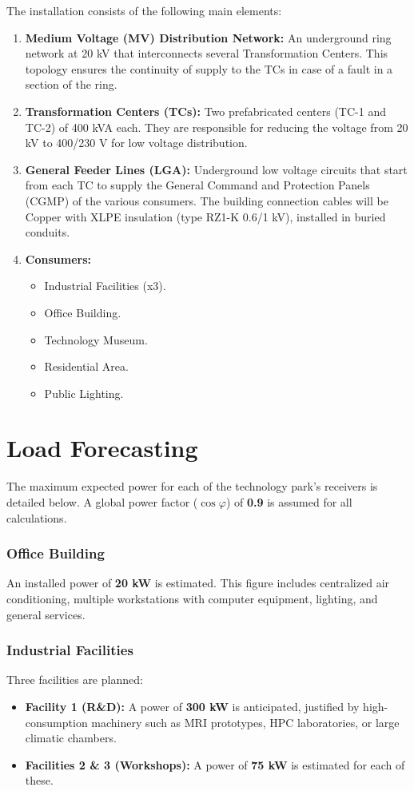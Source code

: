 \documentclass[12pt, a4paper]{report}
\begin{document}
The installation consists of the following main elements:
\begin{enumerate}
    \item \textbf{Medium Voltage (MV) Distribution Network:} An underground ring network at 20 kV that interconnects several Transformation Centers. This topology ensures the continuity of supply to the TCs in case of a fault in a section of the ring.
    \item \textbf{Transformation Centers (TCs):} Two prefabricated centers (TC-1 and TC-2) of 400 kVA each. They are responsible for reducing the voltage from 20 kV to 400/230 V for low voltage distribution.
    \item \textbf{General Feeder Lines (LGA):} Underground low voltage circuits that start from each TC to supply the General Command and Protection Panels (CGMP) of the various consumers. The building connection cables will be Copper with XLPE insulation (type RZ1-K 0.6/1 kV), installed in buried conduits.
    \item \textbf{Consumers:}
    \begin{itemize}
        \item Industrial Facilities (x3).
        \item Office Building.
        \item Technology Museum.
        \item Residential Area.
        \item Public Lighting.
    \end{itemize}
\end{enumerate}

\chapter{Load Forecasting}
\label{chap:cargas}
The maximum expected power for each of the technology park's receivers is detailed below. A global power factor ($\cos \varphi$) of \textbf{0.9} is assumed for all calculations.

\subsection{Office Building}
An installed power of \textbf{20 kW} is estimated. This figure includes centralized air conditioning, multiple workstations with computer equipment, lighting, and general services.

\subsection{Industrial Facilities}
Three facilities are planned:
\begin{itemize}
    \item \textbf{Facility 1 (R\&D):} A power of \textbf{300 kW} is anticipated, justified by high-consumption machinery such as MRI prototypes, HPC laboratories, or large climatic chambers.
    \item \textbf{Facilities 2 \& 3 (Workshops):} A power of \textbf{75 kW} is estimated for each of these.
\end{itemize}
\end{document}
